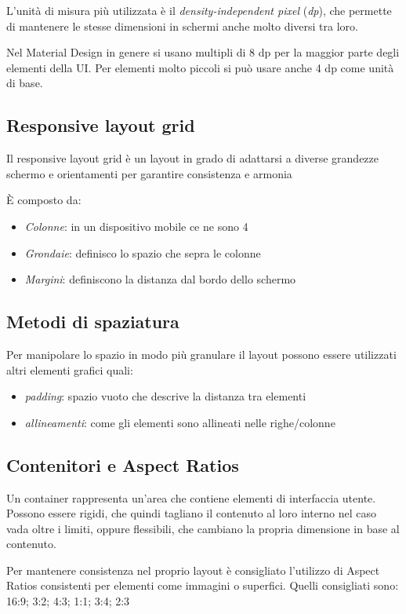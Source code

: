 \documentclass[12pt, a4paper]{report}
\begin{document}
		L'unità di misura più utilizzata è il \textit{density-independent pixel} (\textit{dp}), che permette di mantenere le stesse dimensioni in schermi anche molto diversi tra loro.

		Nel Material Design in genere si usano multipli di 8 dp per la maggior parte degli elementi della UI. Per elementi molto piccoli si può usare anche 4 dp come unità di base.

		\subsection{Responsive layout grid}
			Il responsive layout grid è un layout in grado di adattarsi a diverse grandezze schermo e orientamenti per garantire consistenza e armonia \cite{layout_grid}

			È composto da:
			\begin{itemize}
				\item \textit{Colonne}: in un dispositivo mobile ce ne sono 4
				\item \textit{Grondaie}: definisco lo spazio che sepra le colonne
				\item \textit{Margini}: definiscono la distanza dal bordo dello schermo
			\end{itemize}

		\subsection{Metodi di spaziatura}
			Per manipolare lo spazio in modo più granulare il layout possono essere utilizzati altri elementi grafici quali:
			\begin{itemize}
				\item \textit{padding}: spazio vuoto che descrive la distanza tra elementi
				\item \textit{allineamenti}: come gli elementi sono allineati nelle righe/colonne
			\end{itemize}

		\subsection{Contenitori e Aspect Ratios}
			Un container rappresenta un'area che contiene elementi di interfaccia utente.
			Possono essere rigidi, che quindi tagliano il contenuto al loro interno nel caso vada oltre i limiti, oppure flessibili, che cambiano la propria dimensione in base al contenuto.

			Per mantenere consistenza nel proprio layout è consigliato l'utilizzo di Aspect Ratios consistenti per elementi come immagini o superfici. Quelli consigliati sono: 16:9; 3:2; 4:3; 1:1; 3:4; 2:3 \cite{layout_containers}
\end{document}
